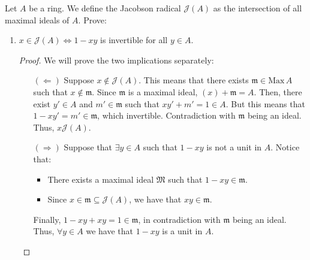
\begin{problem}
    Let $A$ be a ring.
    We define the Jacobson radical $\mathcal{J}(A)$ as the intersection of all maximal ideals of $A$.
    Prove:
    \begin{enumerate}[label=(\theproblem.\arabic*),ref=\theproblem.\arabic*]

        \item \label{itm:jacobson_element_to_invertible}
        $x \in \mathcal{J}(A) \Leftrightarrow 1-xy$ is invertible for all $y \in A$.
            \begin{sol}
                \begin{proof}
                We will prove the two implications separately:
                    \begin{itemize}
                        \item[$(\Leftarrow)$]
                        Suppose $x \notin \mathcal{J}(A)$.
                        This means that there exists $\mathfrak{m} \in \text{Max}\,A$ such that $x \notin \mathfrak{m}$.
                        Since $\mathfrak{m}$ is a maximal ideal, $(x) + \mathfrak{m} = A$.
                        Then, there exist $y' \in A$ and $m' \in \mathfrak{m}$ such that $x y' + m' = 1 \in A$.
                        But this means that $1 - x y' = m' \in \mathfrak{m}$, which invertible.
                        Contradiction with $\mathfrak{m}$ being an ideal.
                        Thus, $x \mathcal{J}(A)$.
                        \item[$(\Rightarrow)$]
                        Suppose that $\exists y \in A$ such that $1-x y$ is not a unit in $A$.
                        Notice that:
                        \begin{itemize}
                            \item There exists a maximal ideal $\mathfrak{M}$ such that $1 - x y \in \mathfrak{m}$.
                            \item Since $x \in \mathfrak{m} \subseteq \mathcal{J}(A)$, we have that $x y \in \mathfrak{m}$.
                        \end{itemize}
                        Finally,  $1 - x y + x y = 1 \in \mathfrak{m}$, in contradiction with $\mathfrak{m}$ being an ideal.
                        Thus, $\forall y \in A$ we have that $1 - x y$ is a unit in $A$.
                    \end{itemize}
                \end{proof}
            \end{sol}


\end{enumerate}
\end{problem}
